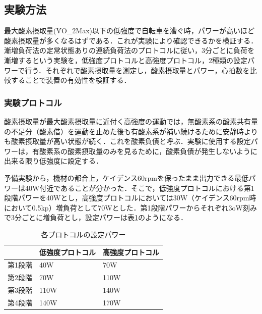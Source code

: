 


\subsection{実験方法}

最大酸素摂取量(\.{V}O_2Max)以下の低強度で自転車を漕ぐ時，パワーが高いほど酸素摂取量が多くなるはずである．これが実験により確認できるかを検証する．漸増負荷法の定常状態ありの連続負荷法のプロトコルに従い\cite{science_of_vo2}，3分ごとに負荷を漸増するという実験を，低強度プロトコルと高強度プロトコル，2種類の設定パワーで行う．それぞれで酸素摂取量を測定し，酸素摂取量とパワー，心拍数を比較することで装置の有効性を検証する．

\subsubsection{実験プロトコル}

酸素摂取量が最大酸素摂取量に近付く高強度の運動では，無酸素系の酸素共有量の不足分（酸素借）を運動を止めた後も有酸素系が補い続けるために安静時よりも酸素摂取量が高い状態が続く．これを酸素負債と呼ぶ．実験に使用する設定パワーは，有酸素系の酸素摂取量のみを見るために，酸素負債が発生しないように出来る限り低強度に設定する．

予備実験から，機材の都合上，ケイデンス60rpmを保ったまま出力できる最低パワーは40W付近であることが分かった．そこで，低強度プロトコルにおける第1段階パワーを40Wとし，高強度プロトコルにおいては30W（ケイデンス60rpm時において0.5kp）増負荷として70Wとした．第1段階パワーからそれぞれ3oW刻みで3分ごとに増負荷とし，設定パワーは表\ref{tb:protocol_power}のようになる．

\begin{table}[]
\begin{center}
  \caption{各プロトコルの設定パワー}
  \label{tb:protocol_power}
  \begin{tabular}{|l|l|l|}
  \hline
       & 低強度プロトコル & 高強度プロトコル \\ \hline
  第1段階 & 40W      & 70W      \\ \hline
  第2段階 & 70W      & 110W     \\ \hline
  第3段階 & 110W     & 140W     \\ \hline
  第4段階 & 140W     & 170W     \\ \hline
  \end{tabular}
\end{center}
\end{table}

